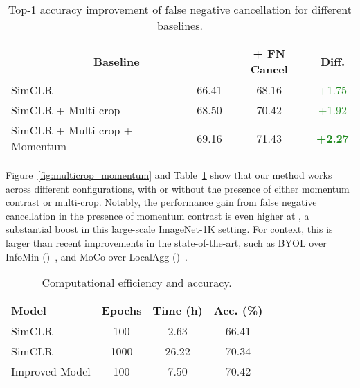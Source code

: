 \documentclass[10pt,twocolumn,letterpaper]{article}
\begin{document}
\begin{table}[h]
    {\footnotesize
    \centering
    \setlength{\tabcolsep}{2pt}
    \begin{tabularx}{\linewidth}{Xccc}
    \toprule
    \multicolumn{2}{c}{Baseline} & + FN Cancel & Diff.\\
    \midrule
    SimCLR & 66.41 & 68.16 & \textcolor{ForestGreen}{+1.75} \\
    SimCLR + Multi-crop & 68.50 & 70.42 & \textcolor{ForestGreen}{+1.92} \\
    SimCLR + Multi-crop + Momentum & 69.16 & 71.43 & \textbf{\textcolor{ForestGreen}{+2.27}} \\
    \bottomrule
    \end{tabularx}}
    \vspace{3pt}
    \caption{Top-1 accuracy improvement of false negative cancellation for different baselines.}\label{tab:fn_improvement}
\end{table}
Figure~\ref{fig:multicrop_momentum} and Table~\ref{tab:fn_improvement} show that our method works across different configurations, with or without the presence of either momentum contrast or multi-crop. Notably, the performance gain from false negative cancellation in the presence of momentum contrast is even higher at , a substantial boost in this large-scale ImageNet-1K setting. For context, this is larger than recent improvements in the state-of-the-art, such as BYOL over InfoMin ()~\cite{grill2020bootstrap}, and MoCo over LocalAgg ()~\cite{he2019moco}.




\begin{table}
    \footnotesize
    \centering
    \begin{tabularx}{\linewidth}{Xccc}
    \toprule
    Model & Epochs & Time (h) & Acc. (\%)\\
    \midrule
    SimCLR & \hphantom{0}100 & \hphantom{2}2.63 & 66.41 \\
    SimCLR & 1000 & 26.22 & 70.34 \\
Improved Model & \hphantom{0}100 & \hphantom{2}7.50 & 70.42 \\
    \bottomrule
    \end{tabularx}
    \vspace{3pt}
    \caption{Computational efficiency and accuracy.} \label{tab:efficiency_final}
    \vspace{-10pt}
\end{table}
\end{document}
